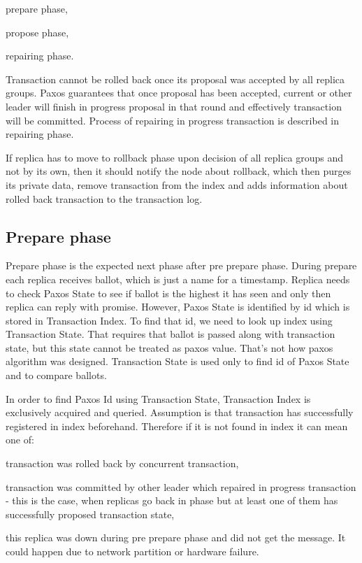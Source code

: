 \begin{enumerate*}
\item prepare phase,
\item propose phase,
\item repairing phase.
\end{enumerate*}


Transaction cannot be rolled back once its proposal was accepted by all replica groups. Paxos guarantees that once proposal has been accepted, current or other leader will finish in progress proposal in that round and effectively transaction will be committed. Process of repairing in progress transaction is described in repairing phase.


If replica has to move to rollback phase upon decision of all replica groups and not by its own, then it should notify the node about rollback, which then purges its private data, remove transaction from the index and adds information about rolled back transaction to the transaction log.


\subsection{Prepare phase}
Prepare phase is the expected next phase after pre prepare phase. During prepare each replica receives ballot, which is just a name for a timestamp. Replica needs to check Paxos State to see if ballot is the highest it has seen and only then replica can reply with promise. However, Paxos State is identified by id which is stored in Transaction Index. To find that id, we need to look up index using Transaction State. That requires that ballot is passed along with transaction state, but this state cannot be treated as paxos value. That’s not how paxos algorithm was designed. Transaction State is used only to find id of Paxos State and to compare ballots.


In order to find Paxos Id using Transaction State, Transaction Index is exclusively acquired and queried. Assumption is that transaction has successfully registered in index beforehand. Therefore if it is not found in index it can mean one of:
\begin{enumerate*}
\item transaction was rolled back by concurrent transaction,
\item transaction was committed by other leader which repaired in progress transaction - this is the case, when replicas go back in phase but at least one of them has successfully proposed transaction state,
\item this replica was down during pre prepare phase and did not get the message. It could happen due to network partition or hardware failure.
\end{enumerate*}


